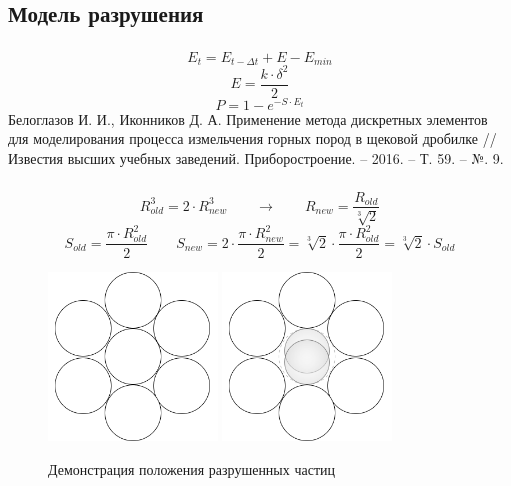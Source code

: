 \documentclass[c]{beamer}  %
\begin{document}
\subsection{Модель разрушения}

\begin{frame}
\frametitle{\insertsection} 
\framesubtitle{\insertsubsection}
\begin{equation}
E_t = E_{t-\Delta t} + E - E_{min}
\end{equation}
\begin{equation}
E = \frac{k \cdot \delta^2}{2}
\end{equation}
\begin{equation}
P = 1 - e^{-S \cdot E_t} 
\end{equation}
Белоглазов И. И., Иконников Д. А. Применение метода дискретных элементов для моделирования процесса измельчения горных пород в щековой дробилке //Известия высших учебных заведений. Приборостроение. – 2016. – Т. 59. – №. 9.
\end{frame}


\begin{frame}
\frametitle{\insertsection} 
\framesubtitle{\insertsubsection}
\begin{equation*}
R_{old}^3 = 2 \cdot R^3_{new} \qquad \rightarrow \qquad R_{new} =\frac{R_{old}}{\sqrt[3]{2}}
\end{equation*}
\begin{equation*}
S_{old} = \frac{\pi \cdot R_{old}^2}{2} \qquad S_{new} = 2 \cdot \frac{\pi \cdot R_{new}^2}{2} = \sqrt[3]{2} \cdot \frac{\pi \cdot R_{old}^2}{2} = \sqrt[3]{2} \cdot S_{old}
\end{equation*}
\begin{figure}[h!]
	\centering
	\includegraphics[width=0.4\textwidth]{1_balls}
	\includegraphics[width=0.4\textwidth]{2_balls}
	\caption{Демонстрация положения разрушенных частиц}
\end{figure} 
\end{frame}
\end{document}
